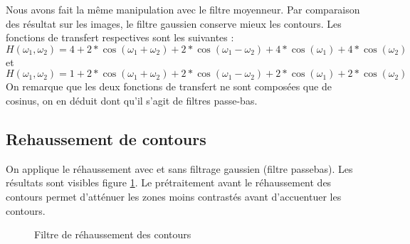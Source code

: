 \documentclass{article}
\begin{document}
Nous avons fait la même manipulation avec le filtre moyenneur. Par comparaison des résultat sur les images, le filtre gaussien conserve mieux les
contours. Les fonctions de transfert respectives sont les suivantes :
\[ H(\omega_1,\omega_2) = 4 + 2*\cos(\omega_1+\omega_2) + 2*\cos(\omega_1-\omega_2) + 4*\cos(\omega_1) + 4*\cos(\omega_2) \]
et
\[ H(\omega_1,\omega_2) = 1 + 2*\cos(\omega_1+\omega_2) + 2*\cos(\omega_1-\omega_2) + 2*\cos(\omega_1) + 2*\cos(\omega_2) \]
On remarque que les deux fonctions de transfert ne sont composées que de cosinus, on en déduit dont qu'il s'agit de filtres passe-bas.

\subsection{Rehaussement de contours}

On applique le réhaussement avec et sans filtrage gaussien (filtre passebas). Les résultats sont visibles figure
\ref{rehauss:init}.
Le prétraitement avant le réhaussement des contours permet d'atténuer les zones moins contrastés avant d'accuentuer les
contours.
\begin{figure}[!ht]%
  \centering
  \hspace{0.030\textwidth}
  \caption{Filtre de réhaussement des contours}
  \label{rehauss:init}
\end{figure}
\end{document}
